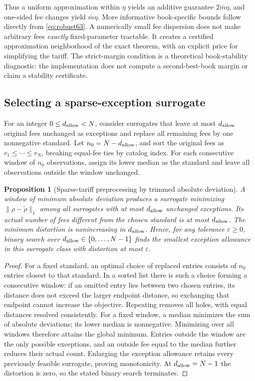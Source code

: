 \documentclass[11pt,letterpaper]{article}
\newtheorem{proposition}[theorem]{Proposition}
\theoremstyle{definition}\newtheorem{remark}[theorem]{Remark}
\begin{document}
Thus a uniform approximation within $\eta$ yields an additive guarantee $2\bar m\eta$, and one-sided fee changes yield $\bar m\eta$. More informative book-specific bounds follow directly from \eqref{eq:robust63}. A numerically small fee dispersion does not make arbitrary fees \emph{exactly} fixed-parameter tractable. It creates a certified approximation neighborhood of the exact theorem, with an explicit price for simplifying the tariff. The strict-margin condition is a theoretical book-stability diagnostic: the implementation does not compute a second-best-book margin or claim a stability certificate.

\subsection{Selecting a sparse-exception surrogate}
For an integer $0\leq d_{\rm allow}<N$, consider surrogates that leave at most $d_{\rm allow}$ original fees unchanged as exceptions and replace all remaining fees by one nonnegative standard. Let $n_0=N-d_{\rm allow}$, and sort the original fees as $r_1\leq\cdots\leq r_N$, breaking equal-fee ties by catalog index. For each consecutive window of $n_0$ observations, assign its lower median as the standard and leave all observations outside the window unchanged.
\begin{proposition}[Sparse-tariff preprocessing by trimmed absolute deviation]\label{prop:projection63}
A window of minimum absolute deviation produces a surrogate minimizing $\|\rho-\widetilde\rho\|_1$ among all surrogates with at most $d_{\rm allow}$ unchanged exceptions. Its actual number of fees different from the chosen standard is at most $d_{\rm allow}$. The minimum distortion is nonincreasing in $d_{\rm allow}$. Hence, for any tolerance $\varepsilon\geq0$, binary search over $d_{\rm allow}\in\{0,\ldots,N-1\}$ finds the smallest exception allowance in this surrogate class with distortion at most $\varepsilon$.
\end{proposition}
\begin{proof}
For a fixed standard, an optimal choice of replaced entries consists of $n_0$ entries closest to that standard. In a sorted list there is such a choice forming a consecutive window: if an omitted entry lies between two chosen entries, its distance does not exceed the larger endpoint distance, so exchanging that endpoint cannot increase the objective. Repeating removes all holes, with equal distances resolved consistently. For a fixed window, a median minimizes the sum of absolute deviations; its lower median is nonnegative. Minimizing over all windows therefore attains the global minimum. Entries outside the window are the only possible exceptions, and an outside fee equal to the median further reduces their actual count. Enlarging the exception allowance retains every previously feasible surrogate, proving monotonicity. At $d_{\rm allow}=N-1$ the distortion is zero, so the stated binary search terminates.
\end{proof}
\end{document}
